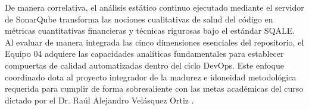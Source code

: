 \documentclass[12pt,oneside]{report}
\begin{document}
De manera correlativa, el análisis estático continuo ejecutado mediante el servidor de SonarQube transforma las nociones cualitativas de salud del código en métricas cuantitativas financieras y técnicas rigurosas bajo el estándar SQALE. Al evaluar de manera integrada las cinco dimensiones esenciales del repositorio, el Equipo 04 adquiere las capacidades analíticas fundamentales para establecer compuertas de calidad automatizadas dentro del ciclo DevOps. Este enfoque coordinado dota al proyecto integrador de la madurez e idoneidad metodológica requerida para cumplir de forma sobresaliente con las metas académicas del curso dictado por el Dr. Raúl Alejandro Velásquez Ortiz \parencite{pressman2014}.

\newpage
\printbibliography[title={Referencias Bibliográficas}, heading=bibintoc]
\end{document}
